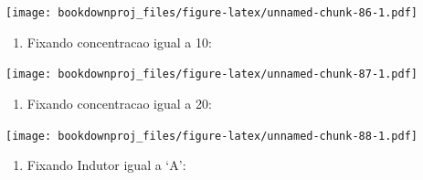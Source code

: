 \documentclass[
]{article}
\newenvironment{Shaded}{\begin{snugshade}}{\end{snugshade}}
\newcommand{\DataTypeTok}[1]{\textcolor[rgb]{0.13,0.29,0.53}{#1}}
\newcommand{\DecValTok}[1]{\textcolor[rgb]{0.00,0.00,0.81}{#1}}
\newcommand{\KeywordTok}[1]{\textcolor[rgb]{0.13,0.29,0.53}{\textbf{#1}}}
\newcommand{\NormalTok}[1]{#1}
\newcommand{\OperatorTok}[1]{\textcolor[rgb]{0.81,0.36,0.00}{\textbf{#1}}}
\newcommand{\StringTok}[1]{\textcolor[rgb]{0.31,0.60,0.02}{#1}}
\providecommand{\tightlist}{%
  \setlength{\itemsep}{0pt}\setlength{\parskip}{0pt}}
\begin{document}
\texttt{[image: bookdownproj\_files/figure-latex/unnamed-chunk-86-1.pdf]}

\begin{enumerate}
\def\labelenumi{\arabic{enumi}.}
\setcounter{enumi}{3}
\tightlist
\item
  Fixando concentracao igual a 10:
\end{enumerate}

\begin{Shaded}
\end{Shaded}

\texttt{[image: bookdownproj\_files/figure-latex/unnamed-chunk-87-1.pdf]}

\begin{enumerate}
\def\labelenumi{\arabic{enumi}.}
\setcounter{enumi}{4}
\tightlist
\item
  Fixando concentracao igual a 20:
\end{enumerate}

\begin{Shaded}
\end{Shaded}

\texttt{[image: bookdownproj\_files/figure-latex/unnamed-chunk-88-1.pdf]}

\begin{enumerate}
\def\labelenumi{\arabic{enumi}.}
\setcounter{enumi}{5}
\tightlist
\item
  Fixando Indutor igual a `A':
\end{enumerate}

\begin{Shaded}
\end{Shaded}
\end{document}
